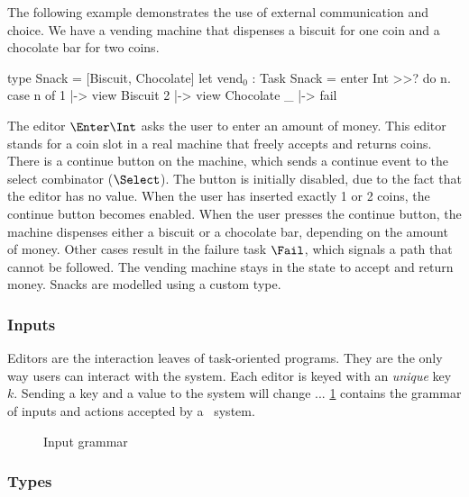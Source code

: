 \begin{example}
  \label{exm:vending-base}
  The following example demonstrates the use of external communication and choice.
  We have a vending machine that dispenses a biscuit for one coin and a chocolate bar for two coins.
  \begin{TASK}
    type Snack = [Biscuit, Chocolate]
    let vend$_0$ : Task Snack = enter Int >>? do n.
      case n of
        1 |-> view Biscuit
        2 |-> view Chocolate
        _ |-> fail
  \end{TASK}
  The editor $\Enter \Int$ asks the user to enter an amount of money.
  This editor stands for a coin slot in a real machine that freely accepts and returns coins.
  There is a continue button on the machine, which sends a continue event to the select combinator ($\Select$).
  The button is initially disabled, due to the fact that the editor has no value.
  When the user has inserted exactly 1 or 2 coins, the continue button becomes enabled.
  When the user presses the continue button, the machine dispenses either a biscuit or a chocolate bar, depending on the amount of money.
  Other cases result in the failure task $\Fail$, which signals a path that cannot be followed.
  The vending machine stays in the state to accept and return money.
  Snacks are modelled using a custom type.
\end{example}


\subsubsection{Inputs}

Editors are the interaction leaves of task-oriented programs.
They are the only way users can interact with the system.
Each editor is keyed with an \emph{unique} key $k$.
Sending a key and a value to the system will change ...
\cref{fig:input-grammar} contains the grammar of inputs and actions accepted by a \TOPHAT\ system.

\begin{figure}[h]
  \caption{Input grammar}
  \label{fig:input-grammar}
\end{figure}


\subsubsection{Types}

